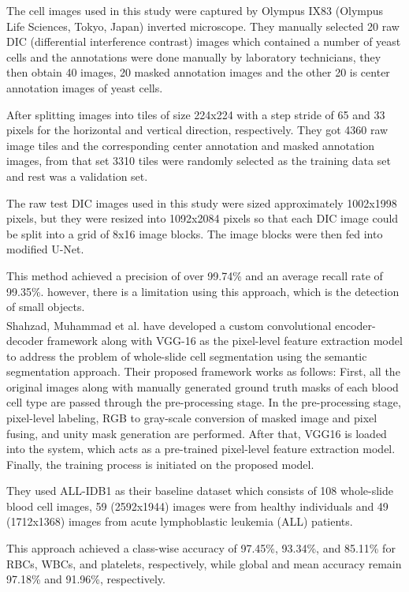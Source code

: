The cell images used in this study were captured by Olympus IX83 (Olympus Life Sciences, Tokyo, Japan) inverted microscope. They manually selected 20 raw DIC (differential interference contrast) images which contained a number of yeast cells and the annotations were done manually by laboratory technicians, they then obtain 40 images, 20 masked annotation images and the other 20 is center annotation images of yeast cells.\

After splitting images into tiles of size 224x224 with a step stride of 65 and 33 pixels for the horizontal and vertical direction, respectively. They got 4360 raw image tiles and the corresponding center annotation and masked annotation images, from that set 3310 tiles were randomly selected as the training data set and rest was a validation set.

The raw test DIC images used in this study were sized approximately 1002x1998 pixels, but they were resized into 1092x2084 pixels so that each DIC image could be split into a grid of 8x16 image blocks. The image blocks were then fed into modified U-Net.

This method achieved a precision of over 99.74\% and an average recall rate of 99.35\%. however, there is a limitation using this approach, which is the detection of small objects.\\

Shahzad, Muhammad et al. \textsuperscript{\cite{shahzad2020robust}} have developed a custom convolutional encoder-decoder framework along with VGG-16 as the pixel-level feature extraction model to address the problem of whole-slide cell segmentation using the semantic segmentation approach. Their proposed framework works as follows: First, all the original images along with manually generated ground truth masks of each blood cell type are passed through the pre-processing stage. In the pre-processing stage, pixel-level labeling, RGB to gray-scale conversion of masked image and pixel fusing, and unity mask generation are performed. After that, VGG16 is loaded into the system, which acts as a pre-trained pixel-level feature extraction model. Finally, the training process is initiated on the proposed model.

They used ALL-IDB1 as their baseline dataset which consists of 108 whole-slide blood cell images, 59 (2592x1944) images were from healthy individuals and 49 (1712x1368) images from acute lymphoblastic leukemia (ALL) patients.

This approach achieved a class-wise accuracy of 97.45\%, 93.34\%, and 85.11\% for RBCs, WBCs, and platelets, respectively, while global and mean accuracy remain 97.18\% and 91.96\%, respectively.\\

